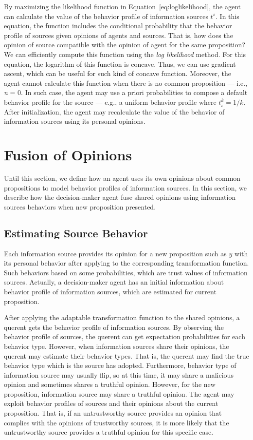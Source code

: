 \documentclass[a4,12pt]{ozu-thesis}
\begin{document}
By maximizing the likelihood function in Equation~\ref{eq:loglikelihood}, the agent can calculate the value of the behavior profile of information sources $\textit{t}^{s}$. In this equation, the function includes the conditional probability that the behavior profile of sources given opinions of agents and sources. That is, how does the opinion of source compatible with the opinion of agent for the same proposition? We can efficiently compute this function using the \textit{log likelihood} method. For this equation, the logarithm of this function is concave. Thus, we can use gradient ascent, which can be useful for such kind of concave function. Moreover, the agent cannot calculate this function when there is no common proposition — i.e., \textit{n} = 0. In such case, the agent may use a priori probabilities to compose a default behavior 
profile for the source — e.g., a uniform behavior profile where $\textit{t}_{i}^{k} = 1 / k$. After initialization, the agent may recalculate the value of the behavior of information sources using its personal opinions. 

\section{Fusion of Opinions}
Until this section, we define how an agent uses its own opinions about common propositions to model behavior profiles of information sources. In this section, we describe how the decision-maker agent fuse shared opinions using information sources behaviors when new proposition presented.


\subsection{Estimating Source Behavior}
Each information source provides its opinion for a new proposition such as $\mathit{y}$ with its personal behavior after applying to the corresponding transformation function. Such behaviors based on some probabilities, which are trust values of information sources. Actually, a decision-maker agent has an initial information about behavior profile of information sources, which are estimated for current proposition.


After applying the adaptable transformation function to the shared opinions, a querent gets the behavior profile of information sources.  By observing the behavior profile of sources, the querent can get expectation probabilities for each behavior type. However, when information sources share their opinions, the querent may estimate their behavior types.  That is, the querent may find the true behavior type which is the source has adopted. Furthermore, behavior type of information source may usually flip, so at this time, it may share a malicious opinion and sometimes shares a truthful opinion. However, for the new proposition, information source may share a truthful opinion. The agent may exploit behavior profiles of sources and their opinions about the current proposition. That is, if an untrustworthy source provides an opinion that complies with the opinions of trustworthy sources, it is more likely that the untrustworthy source provides a truthful opinion for this specific case.
\end{document}
